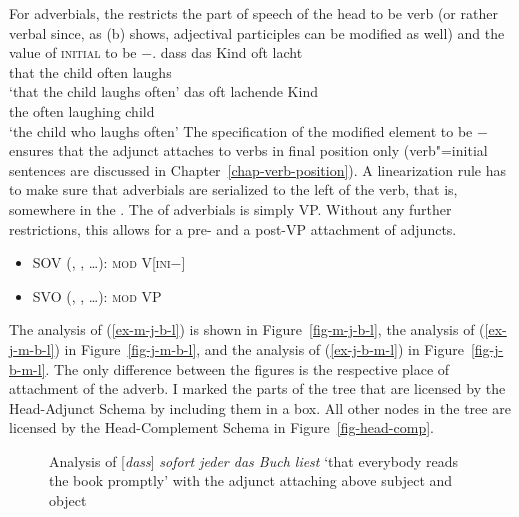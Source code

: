 \noindent
For  adverbials, the \modv restricts the part of speech of the head to be verb (or rather
verbal since, as (b) shows, adjectival participles can be modified as
well) and the value of \textsc{initial} to be $-$. 
\eal
\ex
\gll dass das Kind oft lacht\\
     that the child often laughs\\\german
\glt `that the child laughs often'
\ex 
\gll das oft lachende Kind\\
     the often laughing child\\
\glt `the child who laughs often'
\zl
The specification of the modified element to be \initial{}$-$ ensures that the adjunct attaches to
verbs in final position only (verb"=initial sentences are discussed in
Chapter~\ref{chap-verb-position}). A linearization rule has to make sure that adverbials are
serialized to the left of the verb, that is, somewhere in the \mf. The \modv of  adverbials
is simply VP. Without any further restrictions, this allows for a pre- and a post-VP attachment of
adjuncts.
\begin{itemize}
\item SOV (, , \ldots): \textsc{mod} V[\textsc{ini}$-$]
\item SVO (, , \ldots): \textsc{mod} VP
\end{itemize}

\noindent
The analysis of (\ref{ex-m-j-b-l}) is shown in Figure~\vref{fig-m-j-b-l}, the analysis of
(\ref{ex-j-m-b-l}) in Figure~\vref{fig-j-m-b-l}, and the analysis of (\ref{ex-j-b-m-l}) in
Figure~\vref{fig-j-b-m-l}. The only difference between the figures is the respective place of
attachment of the adverb. I marked the parts of the tree that are licensed by the Head-Adjunct
Schema by including them in a box. All other nodes in the tree are licensed by the Head-Complement
Schema in Figure~\ref{fig-head-comp}.


\begin{figure}

\caption{\label{fig-m-j-b-l}Analysis of [\emph{dass}] \emph{sofort jeder das Buch liest} `that everybody reads the
  book promptly' with the adjunct attaching above subject and object}
\end{figure}


